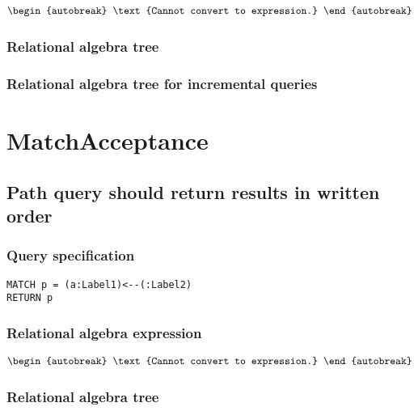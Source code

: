 \begin{align*}
\begin{autobreak}
\text{Cannot convert to expression.}
\end{autobreak}
\end{align*}

\subsubsection*{Relational algebra tree}


\subsubsection*{Relational algebra tree for incremental queries}

\section{MatchAcceptance}


\subsection{Path query should return results in written order}

\subsubsection*{Query specification}

\begin{lstlisting}
MATCH p = (a:Label1)<--(:Label2)
RETURN p
\end{lstlisting}

\subsubsection*{Relational algebra expression}

\begin{align*}
\begin{autobreak}
\text{Cannot convert to expression.}
\end{autobreak}
\end{align*}

\subsubsection*{Relational algebra tree}

